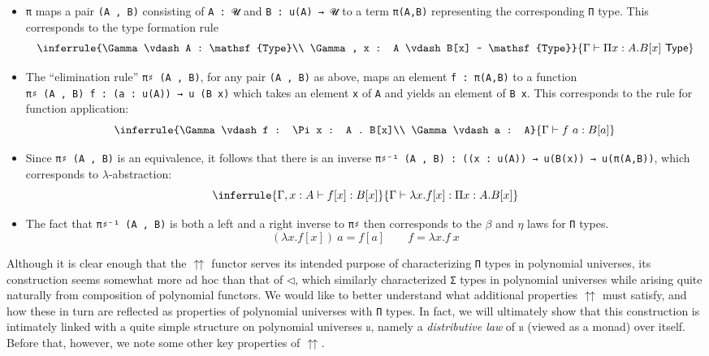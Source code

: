 \documentclass[
  11pt,
  oneside,
  article]{memoir}
\providecommand{\tightlist}{%
  \setlength{\itemsep}{0pt}\setlength{\parskip}{0pt}}
\theoremstyle{definition}
\theoremstyle{plain}
\newcommand{\0}{\textsf{0}}
\newcommand{\1}{\tn{\textsf{1}}}
\begin{document}
\begin{itemize}
\tightlist
\item
  \texttt{π} maps a pair \texttt{(A\ ,\ B)} consisting of
  \texttt{A\ :\ 𝓤} and \texttt{B\ :\ u(A)\ →\ 𝓤} to a term
  \texttt{π(A,B)} representing the corresponding \texttt{Π} type. This
  corresponds to the type formation rule
  \[ \inferrule{\Gamma \vdash A : \mathsf{Type}\\ \Gamma, x : A \vdash B[x] ~ \mathsf{Type}}{\Gamma \vdash \Pi x : A . B[x] ~ \mathsf{Type}} \]
\item
  The ``elimination rule'' \texttt{π♯\ (A\ ,\ B)}, for any pair
  \texttt{(A\ ,\ B)} as above, maps an element \texttt{f\ :\ π(A,B)} to
  a function \texttt{π♯\ (A\ ,\ B)\ f\ :\ (a\ :\ u(A))\ →\ u\ (B\ x)}
  which takes an element \texttt{x} of \texttt{A} and yields an element
  of \texttt{B\ x}. This corresponds to the rule for function
  application: \[
  \inferrule{\Gamma \vdash f : \Pi x : A . B[x]\\ \Gamma \vdash a : A}{\Gamma \vdash f ~ a : B[a]}
  \]
\item
  Since \texttt{π♯\ (A\ ,\ B)} is an equivalence, it follows that there
  is an inverse
  \texttt{π♯⁻¹\ (A\ ,\ B)\ :\ ((x\ :\ u(A))\ →\ u(B(x))\ →\ u(π(A,B))},
  which corresponds to \(\lambda\)-abstraction: \[
  \inferrule{\Gamma, x : A \vdash f[x] : B[x]}{\Gamma \vdash \lambda x . f[x] : \Pi x : A . B[x]}
  \]
\item
  The fact that \texttt{π♯⁻¹\ (A\ ,\ B)} is both a left and a right
  inverse to \texttt{π♯} then corresponds to the \(\beta\) and \(\eta\)
  laws for \texttt{Π} types. \[
  (\lambda x . f[x]) ~ a = f[a] \qquad f = \lambda x . f ~ x
  \]
\end{itemize}

Although it is clear enough that the \(\upuparrows\) functor serves its
intended purpose of characterizing \texttt{Π} types in polynomial
universes, its construction seems somewhat more ad hoc than that of
\(\triangleleft\), which similarly characterized \texttt{Σ} types in
polynomial universes while arising quite naturally from composition of
polynomial functors. We would like to better understand what additional
properties \(\upuparrows\) must satisfy, and how these in turn are
reflected as properties of polynomial universes with \texttt{Π} types.
In fact, we will ultimately show that this construction is intimately
linked with a quite simple structure on polynomial universes \texttt{𝔲},
namely a \emph{distributive law} of \texttt{𝔲} (viewed as a monad) over
itself. Before that, however, we note some other key properties of
\(\upuparrows\).
\end{document}
